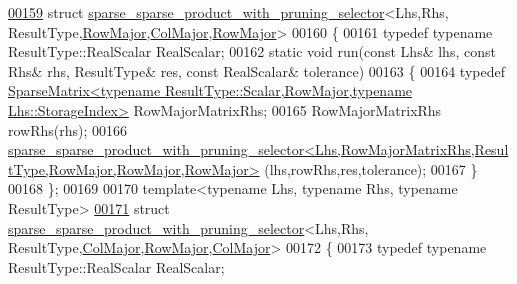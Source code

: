 \begin{DoxyCode}
\hyperlink{struct_eigen_1_1internal_1_1sparse__sparse__product__with__pruning__selector_3_01_lhs_00_01_rhs_b0be43d8f2c00d3048196cb82593ae0c}{00159} \textcolor{keyword}{struct }\hyperlink{struct_eigen_1_1internal_1_1sparse__sparse__product__with__pruning__selector}{sparse\_sparse\_product\_with\_pruning\_selector}<Lhs,Rhs,
      ResultType,\hyperlink{group__enums_ggaacded1a18ae58b0f554751f6cdf9eb13acfcde9cd8677c5f7caf6bd603666aae3}{RowMajor},\hyperlink{group__enums_ggaacded1a18ae58b0f554751f6cdf9eb13a0cbd4bdd0abcfc0224c5fcb5e4f6669a}{ColMajor},\hyperlink{group__enums_ggaacded1a18ae58b0f554751f6cdf9eb13acfcde9cd8677c5f7caf6bd603666aae3}{RowMajor}>
00160 \{
00161   \textcolor{keyword}{typedef} \textcolor{keyword}{typename} ResultType::RealScalar RealScalar;
00162   \textcolor{keyword}{static} \textcolor{keywordtype}{void} run(\textcolor{keyword}{const} Lhs& lhs, \textcolor{keyword}{const} Rhs& rhs, ResultType& res, \textcolor{keyword}{const} RealScalar& tolerance)
00163   \{
00164     \textcolor{keyword}{typedef} 
      \hyperlink{group___sparse_core___module_class_eigen_1_1_sparse_matrix}{SparseMatrix<typename ResultType::Scalar,RowMajor,typename Lhs::StorageIndex>}
       RowMajorMatrixRhs;
00165     RowMajorMatrixRhs rowRhs(rhs);
00166     
      \hyperlink{struct_eigen_1_1internal_1_1sparse__sparse__product__with__pruning__selector}{sparse\_sparse\_product\_with\_pruning\_selector<Lhs,RowMajorMatrixRhs,ResultType,RowMajor,RowMajor,RowMajor>}
      (lhs,rowRhs,res,tolerance);
00167   \}
00168 \};
00169 
00170 \textcolor{keyword}{template}<\textcolor{keyword}{typename} Lhs, \textcolor{keyword}{typename} Rhs, \textcolor{keyword}{typename} ResultType>
\hyperlink{struct_eigen_1_1internal_1_1sparse__sparse__product__with__pruning__selector_3_01_lhs_00_01_rhs_3de0f703bb5ed649050c959104d3eb1b}{00171} \textcolor{keyword}{struct }\hyperlink{struct_eigen_1_1internal_1_1sparse__sparse__product__with__pruning__selector}{sparse\_sparse\_product\_with\_pruning\_selector}<Lhs,Rhs,
      ResultType,\hyperlink{group__enums_ggaacded1a18ae58b0f554751f6cdf9eb13a0cbd4bdd0abcfc0224c5fcb5e4f6669a}{ColMajor},\hyperlink{group__enums_ggaacded1a18ae58b0f554751f6cdf9eb13acfcde9cd8677c5f7caf6bd603666aae3}{RowMajor},\hyperlink{group__enums_ggaacded1a18ae58b0f554751f6cdf9eb13a0cbd4bdd0abcfc0224c5fcb5e4f6669a}{ColMajor}>
00172 \{
00173   \textcolor{keyword}{typedef} \textcolor{keyword}{typename} ResultType::RealScalar RealScalar;

\end{DoxyCode}
